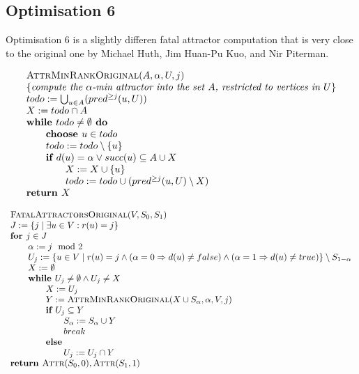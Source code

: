 \documentclass{article}
\begin{document}
\subsection{Optimisation 6}
Optimisation 6 is a slightly differen fatal attractor computation that is very close to the
original one by Michael Huth, Jim Huan-Pu Kuo, and Nir Piterman.

\begin{equation*}
\begin{array}{l}
\text{\textsc{AttrMinRankOriginal}}(A, \alpha, U, j) \\
\{\textit{compute the $\alpha$-min attractor into the set $A$, restricted to vertices in $U$}\}\\
todo := \bigcup_{u \in A} (%
pred^{\geq j}(u, U) ) \\
X := todo \cap A \\
\textbf{while } todo \neq \emptyset \textbf{ do} \\
\qquad \textbf{choose } u \in todo \\
\qquad todo := todo \setminus \{u\} \\
\qquad \textbf{if } d(u) = \alpha \vee succ(u) \subseteq A \cup X \\
\qquad \qquad X := X \cup \{u \} \\
\qquad \qquad todo := todo \cup (%
pred^{\geq j}(u, U) \setminus X)  \\
\textbf{return } X
\end{array}
\end{equation*}

\begin{equation*}
\begin{array}{l}
\text{\textsc{FatalAttractorsOriginal}}(V, S_0, S_1)\\
J := \{ j \mid \exists u \in V : r(u) = j \} \\
\textbf{for } j \in J \\
\qquad \alpha := j \mod 2\\
\qquad U_j := \{u \in V \mid r(u) = j \wedge (\alpha = 0 \Rightarrow d(u) \neq false) 
\wedge (\alpha = 1 \Rightarrow d(u) \neq true) \} \setminus S_{1-\alpha} \\
\qquad X := \emptyset \\
\qquad \textbf{while } U_j \neq \emptyset \wedge U_j \neq X \\ 
\qquad \qquad X := U_j\\
\qquad \qquad Y := \textsc{AttrMinRankOriginal}(X \cup S_\alpha, \alpha, V, j) \\
\qquad \qquad \textbf{if } U_j \subseteq Y \\
\qquad \qquad \qquad S_\alpha := S_\alpha \cup Y \\
\qquad \qquad \qquad break \\
\qquad \qquad \textbf{else }\\
\qquad \qquad \qquad U_j := U_j \cap Y\\
\textbf{return } \textsc{Attr}(S_0, 0), \textsc{Attr}(S_1, 1)
\end{array}
\end{equation*}
\end{document}
